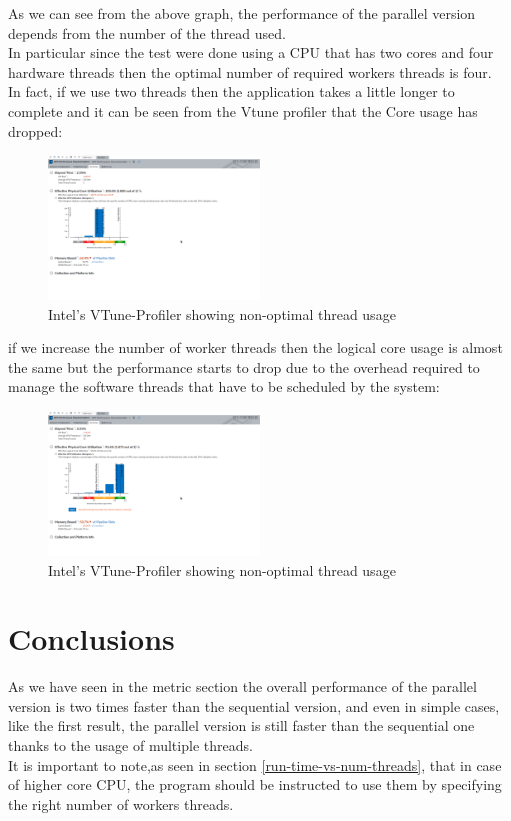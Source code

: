 \documentclass[10pt,twocolumn,letterpaper]{article}
\begin{document}
As we can see from the above graph, the performance of the parallel version depends from the number of the thread used.\\
In particular since the test were done using a CPU that has two cores and four hardware threads then the optimal number of required 
workers threads is four.\\
In fact, if we use two threads then the application takes a little longer to complete and it can be seen from the Vtune profiler that
the Core usage has dropped:\\
\begin{figure}[H]
\centering
\includegraphics[width=0.5\textwidth]{vtune_profiler_under_usage}
\caption{Intel's VTune-Profiler showing non-optimal thread usage}
\end{figure}
if we increase the number of worker threads then the logical core usage is almost the same but the performance starts to drop due to the 
overhead required to manage the software threads that have to be scheduled by the system:\\
\begin{figure}[H]
\centering
\includegraphics[width=0.5\textwidth]{vtune_profiler_over_usage}
\caption{Intel's VTune-Profiler showing non-optimal thread usage}
\end{figure}

\section{Conclusions}
As we have seen in the metric section the overall performance of the parallel version is two times faster than the sequential version,
and even in simple cases, like the first result, the parallel version is still faster than the sequential one thanks to the usage of 
multiple threads.\\
It is important to note,as seen in section \ref{run-time-vs-num-threads}, that in case of higher core CPU, the program should 
be instructed to use them by specifying the right number of workers threads.\\
\end{document}

